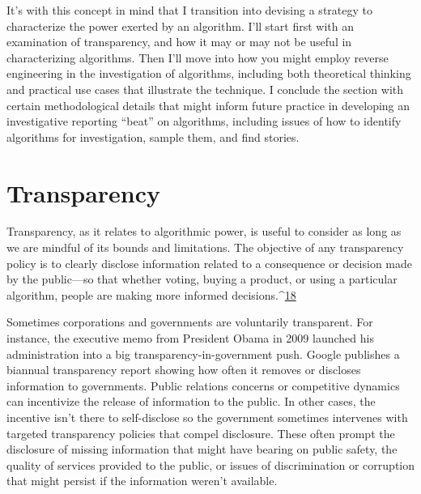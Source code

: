 It's with this concept in mind that I transition into devising a strategy to characterize the power exerted by an algorithm. I'll start first with an examination of transparency, and how it may or may not be useful in characterizing algorithms. Then I'll move into how you might employ reverse engineering in the investigation of algorithms, including both theoretical thinking and practical use cases that illustrate the technique. I conclude the section with certain methodological details that might inform future practice in developing an investigative reporting ``beat'' on algorithms, including issues of how to identify algorithms for investigation, sample them, and find stories.

\chapter{Transparency }
Transparency, as it relates to algorithmic power, is useful to consider as long as we are mindful of its bounds and limitations. The objective of any transparency policy is to clearly disclose information related to a consequence or decision made by the public—so that whether voting, buying a product, or using a particular algorithm, people are making more informed decisions.^{\href{#endnotes}{18}}

Sometimes corporations and governments are voluntarily transparent. For instance, the executive memo from President Obama in 2009 launched his administration into a big transparency-in-government push. Google publishes a biannual transparency report showing how often it removes or discloses information to governments. Public relations concerns or competitive dynamics can incentivize the release of information to the public. In other cases, the incentive isn't there to self-disclose so the government sometimes intervenes with targeted transparency policies that compel disclosure. These often prompt the disclosure of missing information that might have bearing on public safety, the quality of services provided to the public, or issues of discrimination or corruption that might persist if the information weren't available. 

